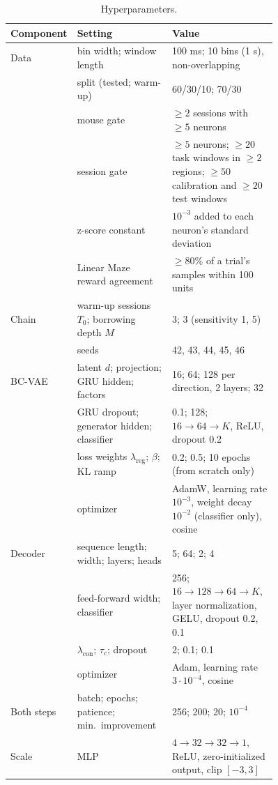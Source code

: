 \documentclass{article}
\begin{document}
\begin{table}[!ht]
  \caption{Hyperparameters.}
  \label{tab:hyper}
  \centering\footnotesize
  \begin{tabular}{@{}l p{0.36\linewidth} p{0.40\linewidth}@{}}
    \toprule
    Component & Setting & Value \\
    \midrule
    Data & bin width; window length & 100 ms; 10 bins (1 s), non-overlapping \\
         & split (tested; warm-up) & 60/30/10; 70/30 \\
         & mouse gate & $\ge2$ sessions with $\ge5$ neurons \\
         & session gate & $\ge5$ neurons; $\ge20$ task windows in $\ge2$ regions; $\ge50$ calibration and $\ge20$ test windows \\
         & z-score constant & $10^{-3}$ added to each neuron's standard deviation \\
         & Linear Maze reward agreement & $\ge80\%$ of a trial's samples within 100 units \\
    Chain & warm-up sessions $T_0$; borrowing depth $M$ & 3; 3 (sensitivity 1, 5) \\
          & seeds & 42, 43, 44, 45, 46 \\
    BC-VAE & latent $d$; projection; GRU hidden; factors & 16; 64; 128 per direction, 2 layers; 32 \\
           & GRU dropout; generator hidden; classifier & 0.1; 128; $16\to64\to K$, ReLU, dropout 0.2 \\
           & loss weights $\lambda_{\mathrm{reg}}$; $\beta$; KL ramp & 0.2; 0.5; 10 epochs (from scratch only) \\
           & optimizer & AdamW, learning rate $10^{-3}$, weight decay $10^{-2}$ (classifier only), cosine \\
    Decoder & sequence length; width; layers; heads & 5; 64; 2; 4 \\
            & feed-forward width; classifier & 256; $16\to128\to64\to K$, layer normalization, GELU, dropout 0.2, 0.1 \\
            & $\lambda_{\mathrm{con}}$; $\tau_c$; dropout & 2; 0.1; 0.1 \\
            & optimizer & Adam, learning rate $3\cdot10^{-4}$, cosine \\
    Both steps & batch; epochs; patience; min.\ improvement & 256; 200; 20; $10^{-4}$ \\
    Scale & MLP & $4\to32\to32\to1$, ReLU, zero-initialized output, clip $[-3,3]$ \\

\end{tabular}
\end{table}
\end{document}
